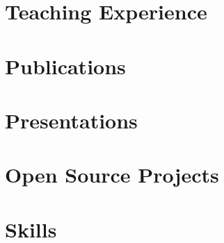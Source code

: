 \documentclass[a4paper,11pt]{article}
\begin{document}
    \section{Teaching Experience}
        \begin{itemize}
            \lecturer
                \cvItemizeBegin
                    \lecturerOne
                    \lecturerTwo
                \cvItemizeEnd
            \supervision
                \cvItemizeBegin
                    \supervisionOne
                    \supervisionTwo
                    \supervisionThree
                    \supervisionFour
                    \supervisionFive
                    \supervisionSix
                    \supervisionSeven
                \cvItemizeEnd
        \end{itemize}

    \section{Publications}
        \publicationItemizeBegin
            \publicationInCIT
            \publicationAAAI
            \publicationPopulationCoded
            \publicationSpikingTransformer
            \publicationRateCoded
            \publicationEncodingSurvey
            \publicationBernstainTwo
            \publicationDAICAFGR
            \publicationDAICANN
            \publicationBernsteinOne
            \publicationBernsteinDA
            \publicationReport
        \publicationItemizeEnd
 
    \section{Presentations}
        \presentations

    \section{Open Source Projects}
        \begin{itemize}
            \fossHPZ
                \cvItemizeBegin
                    \fossHPZOne
                    \fossHPZTwo
                    \fossHPZThree
                \cvItemizeEnd
            \fossConvSnn
                \cvItemizeBegin
                    \fossConvSnnOne
                    \fossConvSnnTwo
                \cvItemizeEnd
            \fossRazerDataScience
                \cvItemizeBegin
                    \fossRazerDataScienceOne
                \cvItemizeEnd
        \end{itemize}

    \section{Skills}
        \begin{itemize}
            \skillsProgramming
            \skillsLanguages
            \skillsInterests
        \end{itemize}
\end{document}
